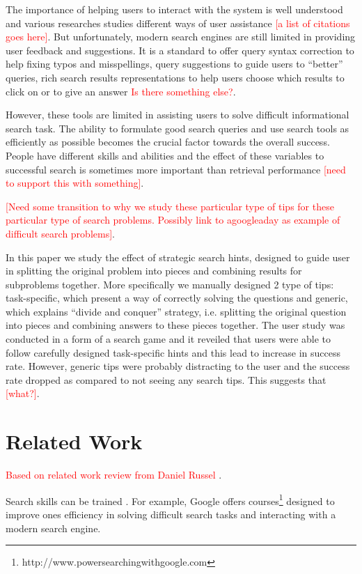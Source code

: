 \documentclass{sig-alternate}
\newcommand\todo[1]{\textcolor{red}{#1}}
\begin{document}
The importance of helping users to interact with the system is well understood and various researches studies different ways of user assistance \todo{[a list of citations goes here]}. But unfortunately, modern search engines are still limited in providing user feedback and suggestions. It is a standard to offer query syntax correction to help fixing typos and misspellings, query suggestions to guide users to ``better'' queries, rich search results representations to help users choose which results to click on or to give an answer \todo{Is there something else?}.

However, these tools are limited in assisting users to solve difficult informational search task. The ability to formulate good search queries and use search tools as efficiently as possible becomes the crucial factor towards the overall success. People have different skills and abilities and the effect of these variables to successful search is sometimes more important than retrieval performance \todo{[need to support this with something]}. 

\todo{[Need some transition to why we study these particular type of tips for these particular type of search problems. Possibly link to agoogleaday as example of difficult search problems]}. 

In this paper we study the effect of strategic search hints, designed to guide user in splitting the original problem into pieces and combining results for subproblems together. More specifically we manually designed 2 type of tips: task-specific, which present a way of correctly solving the questions and generic, which explains ``divide and conquer'' strategy, i.e. splitting the original question into pieces and combining answers to these pieces together. The user study was conducted in a form of a search game and it reveiled that users were able to follow carefully designed task-specific hints and this lead to increase in success rate. However, generic tips were probably distracting to the user and the success rate dropped as compared to not seeing any search tips.
This suggests that \todo{[what?]}.

\section{Related Work}
\todo{Based on related work review from Daniel Russel \cite{Moraveji:2011:MIU:2009916.2009966}}.

Search skills can be trained \cite{Moraveji:2011:MIU:2009916.2009966}. For example, Google offers courses\footnote{http://www.powersearchingwithgoogle.com} designed to improve ones efficiency in solving difficult search tasks and interacting with a modern search engine.
\end{document}
